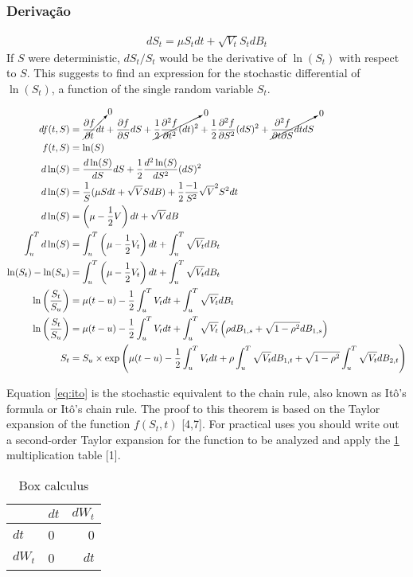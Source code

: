 \documentclass[12pt,twoside]{reedthesis}
\theoremstyle{definition}
\theoremstyle{definition}
\theoremstyle{remark}
\begin{document}
  \subsubsection{Derivação}\label{derivacao}
  \begin{align}
  dS_t = \mu S_t dt + \sqrt{V_t} S_t dB_t
  \end{align}
  If \(S\) were deterministic, \(dS_t/S_t\) would be the derivative of
  \(\ln(S_t)\) with respect to \(S\). This suggests to find an expression
  for the stochastic differential of \(\ln(S_t)\), a function of the
  single random variable \(S_t\).
  \begin{scriptsize}
  \begin{align}
  df(t,S) &= \cancelto{0}{\frac{\partial f}{\partial t}dt}  + \frac{\partial f}{\partial S} dS + \cancelto{0}{\frac{1}{2} \frac{\partial^2 f}{\partial t^2} (dt)^2} + \frac{1}{2} \frac{\partial^2 f}{\partial S^2} (dS)^2  + \cancelto{0}{\frac{\partial^2 f}{\partial t \partial S} dt dS} \\
  f(t,S) &= \ln(S) \\
  d\ln(S) &= \frac{d\ln(S)}{dS} dS + \frac{1}{2} \frac{d^2\ln(S)}{dS^2}(dS)^2 \\
  d\ln(S) &= \frac{1}{S} (\mu S dt + \sqrt{V} S dB) + \frac{1}{2}\frac{-1}{S^2}\sqrt{V}^2 S^2 dt \\
  d\ln(S) &= \left( \mu -  \frac{1}{2} V \right) dt + \sqrt{V} dB \\
  \int_{u}^{T}{d\ln(S)} &= \int_{u}^{T}{\left( \mu - \frac{1}{2} V_t \right) dt} + \int_{u}^{T}{\sqrt{V_t}dB_t} \\
  \ln(S_t) - \ln(S_u) &= \int_{u}^{T}{\left( \mu - \frac{1}{2} V_t \right) dt} + \int_{u}^{T}{\sqrt{V_t}dB_t} \\
  \ln \left( \frac{S_t}{S_u} \right) &= \mu (t-u) - \frac{1}{2}\int_{u}^{T}{V_t dt} + \int_{u}^{T}{\sqrt{V_t} dB_t} \\
  \ln \left( \frac{S_t}{S_u} \right) &= \mu (t-u) - \frac{1}{2}\int_{u}^{T}{V_t dt} + \int_{u}^{T}{\sqrt{V_t} \left(\rho dB_{1,s} + \sqrt{1-\rho^2} dB_{1,s} \right)} \\
  S_t &= S_u \times \exp \left( \mu (t-u) - \frac{1}{2} \int_{u}^{T}{V_t dt} + \rho \int_{u}^{T}{\sqrt{V_t}dB_{1,t}}+ \sqrt{1 - \rho^2} \int_{u}^{T}{\sqrt{V_t}dB_{2,t}} \right)
  \end{align}
  \end{scriptsize}
  Equation \eqref{eq:ito} is the stochastic equivalent to the chain rule,
  also known as Itô's formula or Itô's chain rule. The proof to this
  theorem is based on the Taylor expansion of the function \(f(S_t, t)\)
  {[}4,7{]}. For practical uses you should write out a second-order Taylor
  expansion for the function to be analyzed and apply the
  \ref{tab:box-calc} multiplication table {[}1{]}.
  \begin{longtable}[t]{llr}
  \caption{\label{tab:box-calc}Box calculus}\\
  \toprule
    & $dt$ & $dW_t$\\
  \midrule
  $dt$ & 0 & 0\\
  $dW_t$ & 0 & $dt$\\
  \bottomrule
  \end{longtable}
\end{document}
